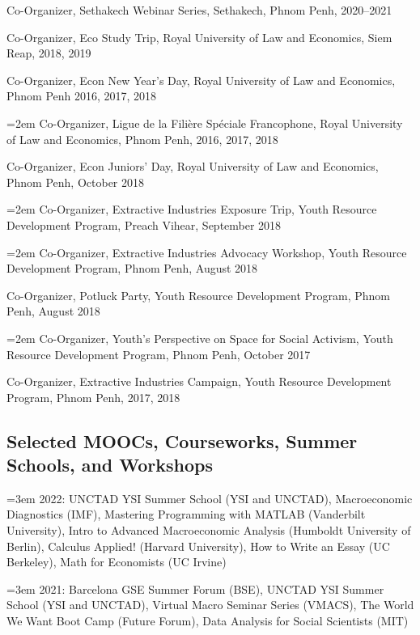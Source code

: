 \documentclass[10pt,a4paper]{article}
\begin{document}
	Co-Organizer, Sethakech Webinar Series, Sethakech, Phnom Penh, 2020--2021

	Co-Organizer, Eco Study Trip, Royal University of Law and Economics, Siem Reap, 2018, 2019

	Co-Organizer, Econ New Year's Day, Royal University of Law and Economics, Phnom Penh 2016, 2017, 2018

\hangindent=2em
	Co-Organizer, Ligue de la Filière Spéciale Francophone, Royal University of Law and Economics, Phnom Penh, 2016, 2017, 2018 
		
	Co-Organizer, Econ Juniors' Day, Royal University of Law and Economics, Phnom Penh, October 2018
		
\hangindent=2em
	Co-Organizer, Extractive Industries Exposure Trip, Youth Resource Development Program, Preach Vihear, September 2018

\hangindent=2em
	Co-Organizer, Extractive Industries Advocacy Workshop, Youth Resource Development Program, Phnom Penh, August 2018
		
	Co-Organizer, Potluck Party, Youth Resource Development Program, Phnom Penh, August 2018

\hangindent=2em
	Co-Organizer, Youth's Perspective on Space for Social Activism, Youth Resource Development Program, Phnom Penh, October 2017
		
	Co-Organizer, Extractive Industries Campaign, Youth Resource Development Program, Phnom Penh, 2017, 2018		

\subsection*{Selected MOOCs, Courseworks, Summer Schools, and Workshops}

\hangindent=3em
	2022: UNCTAD YSI Summer School (YSI and UNCTAD), Macroeconomic Diagnostics (IMF), Mastering Programming with MATLAB (Vanderbilt University), Intro to Advanced Macroeconomic Analysis (Humboldt University of Berlin), Calculus Applied! (Harvard University), How to Write an Essay (UC Berkeley), Math for Economists (UC Irvine)

\hangindent=3em
	2021: Barcelona GSE Summer Forum (BSE), UNCTAD YSI Summer School (YSI and UNCTAD), Virtual Macro Seminar Series (VMACS), The World We Want Boot Camp (Future Forum), Data Analysis for Social Scientists (MIT)
\end{document}
